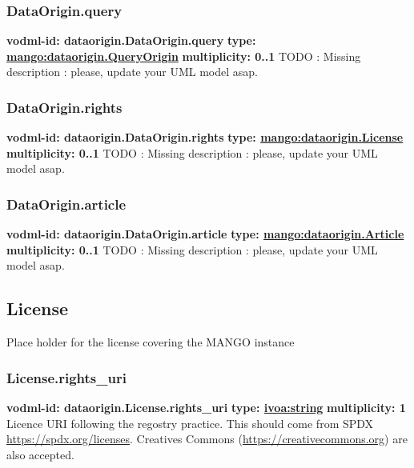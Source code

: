     \subsubsection{DataOrigin.query}
      \textbf{vodml-id: dataorigin.DataOrigin.query} \newline
      \textbf{type: \hyperref[sect:dataorigin.QueryOrigin]{mango:dataorigin.QueryOrigin}} \newline
      \textbf{multiplicity: 0..1} \newline 
      TODO : Missing description : please, update your UML model asap.

    \subsubsection{DataOrigin.rights}
      \textbf{vodml-id: dataorigin.DataOrigin.rights} \newline
      \textbf{type: \hyperref[sect:dataorigin.License]{mango:dataorigin.License}} \newline
      \textbf{multiplicity: 0..1} \newline 
      TODO : Missing description : please, update your UML model asap.

    \subsubsection{DataOrigin.article}
      \textbf{vodml-id: dataorigin.DataOrigin.article} \newline
      \textbf{type: \hyperref[sect:dataorigin.Article]{mango:dataorigin.Article}} \newline
      \textbf{multiplicity: 0..1} \newline 
      TODO : Missing description : please, update your UML model asap.

  \subsection{License}
  \label{sect:dataorigin.License}
    Place holder for the license covering the MANGO instance

    \subsubsection{License.rights\_uri}
      \textbf{vodml-id: dataorigin.License.rights\_uri} \newline
      \textbf{type: \hyperref[sect:ivoa]{ivoa:string}} \newline
      \textbf{multiplicity: 1} \newline 
      Licence URI following the regostry practice. This should come from SPDX \url{https://spdx.org/licenses}. Creatives Commons (\url{https://creativecommons.org}) are also accepted.


